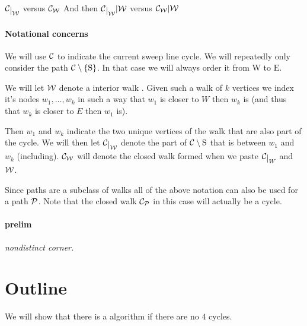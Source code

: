 

\newcommand\restrict[1]{\raisebox{-.5ex}{$|$}_{#1}}


\maketitle


\newcommand{\W}{\scr W}
\renewcommand{\P}{\scr P}
\newcommand{\restC}[1]{\ensuremath{\C\restrict{#1}}}

\newcommand{\mrN}{\mathrm{N}}
\newcommand{\mrS}{\mathrm{S}}
\newcommand{\mrE}{\mathrm{E}}
\newcommand{\mrW}{\mathrm{W}}

\newcommand{\pN}{\mathrm{N}}
\newcommand{\pS}{\mathrm{S}}
\newcommand{\pE}{\mathrm{E}}
\newcommand{\pW}{\mathrm{W}}

\newcommand{\cpath}{\C \setminus \braces{\mrS}} %


\restC{\W} versus $\C_\W$ And then $\restC{\W} | \W$ versus $\C_\W|\W$

\paragraph{Notational concerns}
We will use $\mathcal{C}$ to indicate the current sweep line cycle. 
We will repeatedly only consider the path $\cpath$. In that case we will always order it from $\mrW$ to $\mrE$. 

We will let $\W$ denote a interior walk  . Given such a walk of $k$ vertices we index it's nodes $w_1, \ldots, w_k$  in such a way that $w_1$ is closer to $W$ then $w_k$ is (and thus that $w_k$ is closer to $E$ then $w_1$ is). 

Then $w_1$ and $w_k$ indicate the two unique vertices of the walk that are also part of the cycle. We will then let $\restC{\W}$ denote the part of $\mathcal{C}\setminus {\mathrm{S}}$ that is between $w_1$ and $w_k$ (including). $\C_\W$ will denote the closed walk formed when we paste $\restC{W}$ and $\W$.

Since paths are a subclass of walks all of the above notation can also be used for a path $\P$. Note that the closed walk $\C_\P$ in this case will actually be a cycle.


\paragraph{prelim}
\emph{nondistinct corner.}

\section{Outline}
We will show that there is a algorithm if there are no $4$ cycles.

